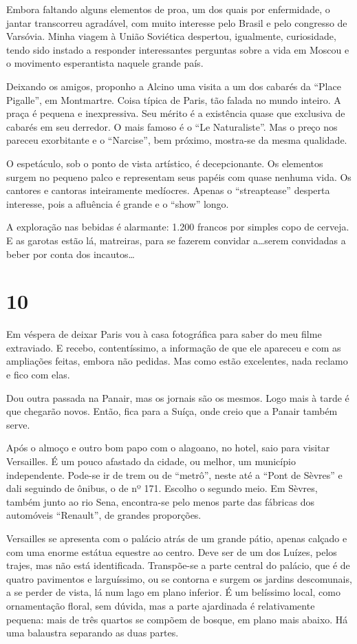 Embora faltando alguns elementos de proa, um dos quais por enfermidade, o jantar transcorreu agradável, com muito interesse pelo Brasil e pelo congresso de Varsóvia. Minha viagem à União Soviética despertou, igualmente, curiosidade, tendo sido instado a responder interessantes perguntas sobre a vida em Moscou e o movimento esperantista naquele grande país.

Deixando os amigos, proponho a Alcino uma visita a um dos cabarés da “Place Pigalle”, em Montmartre. Coisa típica de Paris, tão falada no mundo inteiro. A praça é pequena e inexpressiva. Seu mérito é a existência quase que exclusiva de cabarés em seu derredor. O mais famoso é o “Le Naturaliste”. Mas o preço nos pareceu exorbitante e o “Narcise”, bem próximo, mostra-se da mesma qualidade.

O espetáculo, sob o ponto de vista artístico, é decepcionante. Os elementos surgem no pequeno palco e representam seus papéis com quase nenhuma vida. Os cantores e cantoras inteiramente medíocres. Apenas o “streaptease” desperta interesse, pois a afluência é grande e o “show” longo.

A exploração nas bebidas é alarmante: 1.200 francos por simples copo de cerveja. E as garotas estão lá, matreiras, para se fazerem convidar a\ldots serem convidadas a beber por conta dos incautos\ldots

\section*{10 \adfflatleafright {}}
Em véspera de deixar Paris vou à casa fotográfica para saber do meu filme extraviado. E recebo, contentíssimo, a informação de que ele apareceu e com as ampliações feitas, embora não pedidas. Mas como estão excelentes, nada reclamo e fico com elas.

Dou outra passada na Panair, mas os jornais são os mesmos. Logo mais à tarde é que chegarão novos. Então, fica para a Suíça, onde creio que a Panair também serve.

Após o almoço e outro bom papo com o alagoano, no hotel, saio para visitar Versailles. É um pouco afastado da cidade, ou melhor, um município independente. Pode-se ir de trem ou de “metrô”, neste até a “Pont de Sèvres” e dali seguindo de ônibus, o de nº 171. Escolho o segundo meio. Em Sèvres, também junto ao rio Sena, encontra-se pelo menos parte das fábricas dos automóveis “Renault”, de grandes proporções.

Versailles se apresenta com o palácio atrás de um grande pátio, apenas calçado e com uma enorme estátua equestre ao centro. Deve ser de um dos Luízes, pelos trajes, mas não está identificada. Transpõe-se a parte central do palácio, que é de quatro pavimentos e larguíssimo, ou se contorna e surgem os jardins descomunais, a se perder de vista, lá num lago em plano inferior. É um belíssimo local, como ornamentação floral, sem dúvida, mas a parte ajardinada é relativamente pequena: mais de três quartos se compõem de bosque, em plano mais abaixo. Há uma balaustra separando as duas partes.

